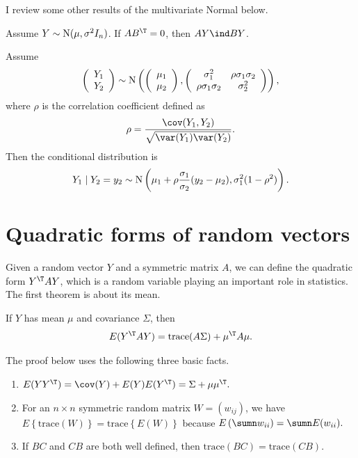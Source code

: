 I review some other results of the multivariate Normal below. 
 
\begin{proposition}
Assume $Y\sim\textup{N}(\mu,\sigma^{2}I_{n})$. If $AB^{\T}=0$, then
$AY\ind BY$.
\end{proposition}
%
%
\begin{proposition}
Assume %
\[
\left(\begin{array}{c}
Y_{1}\\
Y_{2}
\end{array}\right)\sim\textup{N}\left(\left(\begin{array}{c}
\mu_{1}\\
\mu_{2}
\end{array}\right),\left(\begin{array}{cc}
\sigma_{1}^{2} & \rho\sigma_{1}\sigma_{2}\\
\rho\sigma_{1}\sigma_{2} & \sigma_{2}^{2}
\end{array}\right)\right),
\]
where $\rho$ is the correlation coefficient defined as
\[
\rho=\frac{\cov(Y_{1},Y_{2})}{\sqrt{\var(Y_{1})\var(Y_{2})}}.
\]
Then the conditional distribution is
\[
Y_{1}\mid Y_{2}=y_{2}\sim\textup{N}\left(\mu_{1}+\rho\frac{\sigma_{1}}{\sigma_{2}}(y_{2}-\mu_{2}),\sigma_{1}^{2}(1-\rho^{2})\right).
\]
\end{proposition}
%


\section{Quadratic forms of random vectors}

Given a random vector $Y$ and a symmetric matrix $A$, we can define
the quadratic form $Y^{\T}AY$, which is a random variable playing
an important role in statistics. The first theorem is about its mean.

\begin{theorem}\label{thm::mean-quadratic-form}
If $Y$ has mean $\mu$ and covariance $\Sigma$, then 
\[
E(Y^{\T}AY)=\textup{trace}(A\Sigma)+\mu^{\T}A\mu.
\]
\end{theorem}

The proof below uses the following three basic facts.
\begin{enumerate}[label=(\textup{F}\arabic*), ref=\textup{F}\arabic*]
\item\label{item::fact1} $E(YY^{\T})=\cov(Y)+E(Y)E(Y^{\T})=\Sigma+\mu\mu^{\T}.$
\item\label{item::fact2} For an $n\times n$ symmetric random matrix $W=(w_{ij})$, we have $E\left\{ \text{trace}(W)\right\} =\text{trace}\left\{ E(W)\right\} $ because $E\left(\sumn w_{ii}\right)=\sumn E(w_{ii}) .$
\item\label{item::fact3}
If $BC$ and $CB$ are both well defined, then $\text{trace}(BC)=\text{trace}(CB)$. 
\end{enumerate}


